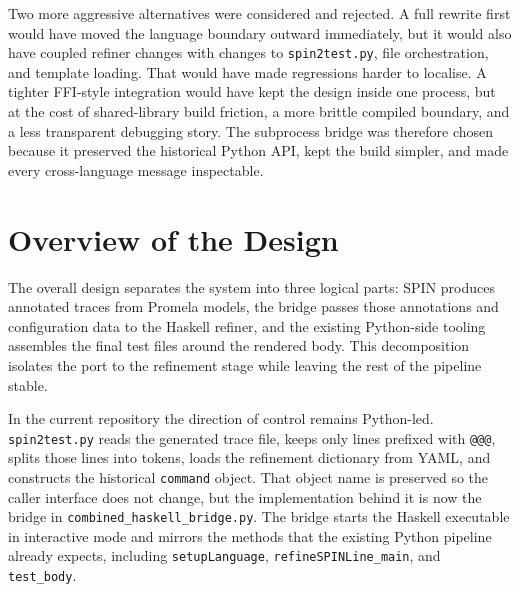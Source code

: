 Two more aggressive alternatives were considered and rejected. A full
rewrite first would have moved the language boundary outward
immediately, but it would also have coupled refiner changes with
changes to \texttt{spin2test.py}, file orchestration, and template
loading. That would have made regressions harder to localise. A
tighter FFI-style integration would have kept the design inside one
process, but at the cost of shared-library build friction, a more
brittle compiled boundary, and a less transparent debugging story. The
subprocess bridge was therefore chosen because it preserved the
historical Python API, kept the build simpler, and made every
cross-language message inspectable.


\section{Overview of the Design}
\label{sec:OverviewOfDesign}


The overall design separates the system into three logical parts:
SPIN produces annotated traces from Promela models, the bridge passes
those annotations and configuration data to the Haskell refiner, and
the existing Python-side tooling assembles the final test files around
the rendered body. This decomposition isolates the port to the
refinement stage while leaving the rest of the pipeline stable.

In the current repository the direction of control remains Python-led.
\texttt{spin2test.py} reads the generated trace file, keeps only lines
prefixed with \texttt{@@@}, splits those lines into tokens, loads the
refinement dictionary from YAML, and constructs the historical
\texttt{command} object. That object name is preserved so the caller
interface does not change, but the implementation behind it is now the
bridge in \texttt{combined\_haskell\_bridge.py}. The bridge starts the
Haskell executable in interactive mode and mirrors the methods that
the existing Python pipeline already expects, including
\texttt{setupLanguage}, \texttt{refineSPINLine\_main}, and
\texttt{test\_body}.

